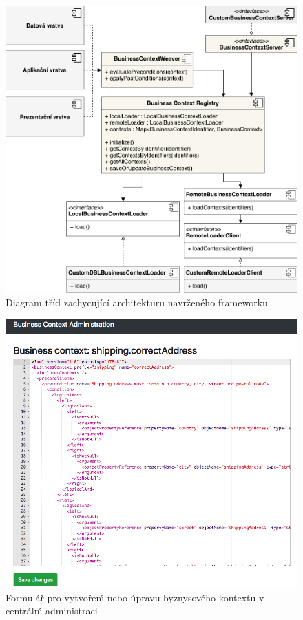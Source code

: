 \begin{figure}
    \centering
    \includegraphics[keepaspectratio=true, width=\linewidth]{figures/business-context-registry.pdf}
    \caption{Diagram tříd zachycující architekturu navrženého frameworku}
    \label{fig:business-context-registry}
\end{figure}

\begin{figure}
    \centering
    \includegraphics[width=0.9\linewidth]{figures/business-context-edit.png}
    \caption{Formulář pro vytvořen\'{\i} nebo úpravu byznysového kontextu v centráln\'{\i} administraci}
    \label{fig:screenshot-context-edit}
\end{figure}

